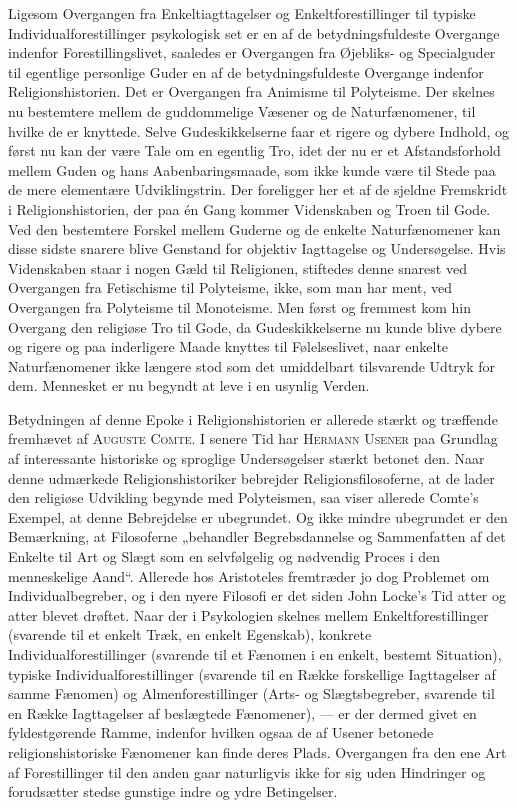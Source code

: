 \documentclass[12pt,a4paper,openany]{book}
\newcommand{\opage}[1]{\marginnote{\footnotesize\textit{[#1]}}}
\begin{document}
Ligesom Overgangen fra Enkeltiagttagelser og Enkeltforestillinger til
typiske Individualforestillinger psykologisk set er en af de
betydningsfuldeste Overgange indenfor Forestillingslivet, saaledes er
Overgangen fra Øjebliks- og Specialguder til egentlige personlige Guder
en af de betydningsfuldeste Overgange indenfor Religionshistorien. Det
er Overgangen fra Animisme til Polyteisme. Der skelnes nu bestemtere
mellem de guddommelige Væsener og de Naturfænomener, til hvilke de er
knyttede. Selve Gudeskikkelserne faar et rigere og dybere Indhold, og
først nu kan der være Tale om en egentlig Tro, idet der nu er et
Afstandsforhold mellem Guden og hans Aabenbaringsmaade, som ikke kunde
være til Stede paa de mere elementære Udviklingstrin. Der foreligger her
et af de sjeldne Fremskridt i Religionshistorien, der paa én Gang kommer
Videnskaben og Troen til Gode. Ved den bestemtere Forskel mellem Guderne
og de enkelte Naturfænomener kan disse sidste snarere blive Genstand for
objektiv Iagttagelse og Undersøgelse. Hvis Videnskaben staar i nogen
Gæld til Religionen, stiftedes denne snarest ved Overgangen fra
Fetischisme til Polyteisme, ikke, som man har ment, ved Overgangen fra
Polyteisme til Monoteisme. Men først og fremmest kom hin Overgang den
religiøse Tro til Gode, da Gudeskikkelserne nu
\opage{94}kunde blive dybere og rigere og paa inderligere Maade knyttes
til Følelseslivet, naar enkelte Naturfænomener ikke længere stod som det
umiddelbart tilsvarende Udtryk for dem. Mennesket er nu begyndt at leve
i en usynlig Verden.

Betydningen af denne Epoke i Religionshistorien er allerede stærkt og
træffende fremhævet af \textsc{Auguste Comte}. I senere Tid har
\textsc{Hermann Usener} paa Grundlag af interessante historiske og
sproglige Undersøgelser stærkt betonet den. Naar denne udmærkede
Religionshistoriker bebrejder Religionsfilosoferne, at de lader den
religiøse Udvikling begynde med Polyteismen, saa viser allerede Comte’s
Exempel, at denne Bebrejdelse er ubegrundet. Og ikke mindre ubegrundet
er den Bemærkning, at Filosoferne „behandler Begrebsdannelse og
Sammenfatten af det Enkelte til Art og Slægt som en selvfølgelig og
nødvendig Proces i den menneskelige Aand“. Allerede hos Aristoteles
fremtræder jo dog Problemet om Individualbegreber, og i den nyere
Filosofi er det siden John Locke’s Tid atter og atter blevet drøftet.
Naar der i Psykologien skelnes mellem Enkeltforestillinger (svarende til
et enkelt Træk, en enkelt Egenskab), konkrete Individualforestillinger
(svarende til et Fænomen i en enkelt, bestemt Situation), typiske
Individualforestillinger (svarende til en Række forskellige Iagttagelser
af samme Fænomen) og Almenforestillinger (Arts- og Slægtsbegreber,
svarende til en Række Iagttagelser af beslægtede Fænomener), --- er der
dermed givet en fyldestgørende Ramme, indenfor hvilken ogsaa de af
Usener betonede religionshistoriske Fænomener kan finde deres Plads.
Overgangen fra den ene Art af Forestillinger til den anden gaar
naturligvis ikke for sig uden Hindringer og forudsætter stedse gunstige
indre og ydre Betingelser.
\end{document}
